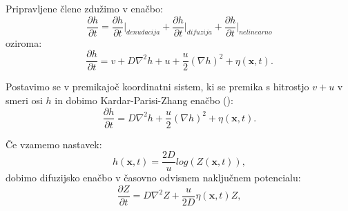 \documentclass[a4paper, twoside, 12pt]{book}
\begin{document}

Pripravljene člene zdužimo v enačbo:
\begin{equation}
  \frac{\partial h}{\partial t} = \frac{\partial h}{\partial t} \bigg|_{denudacija} + \frac{\partial h}{\partial t} \bigg|_{difuzija} + \frac{\partial h}{\partial t} \bigg|_{nelinearno}
  \label{KPZ1}
\end{equation}
oziroma:
\begin{equation}
  \frac{\partial h}{\partial t} = v + D \nabla^2 h + u + \frac{u}{2} (\nabla h)^2 + \eta (\mathbf{x},t).
  \label{KPZ2}
\end{equation}

Postavimo se v premikajoč koordinatni sistem, ki se premika s hitrostjo $v + u$ v smeri osi $h$ in dobimo Kardar-Parisi-Zhang enačbo (\cite{kardar1986dynamic}):
\begin{equation}
  \frac{\partial h}{\partial t} = D \nabla^2 h + \frac{u}{2} (\nabla h)^2 + \eta (\mathbf{x},t).
  \label{KPZ}
\end{equation}

Če vzamemo nastavek:
\begin{equation}
  h(\mathbf{x},t) = \frac{2 D}{u} log(Z(\mathbf{x},t)),
\end{equation}
dobimo difuzijsko enačbo v časovno odvisnem naključnem potencialu:
\begin{equation}
  \frac{\partial Z}{\partial t} = D \nabla^2 Z + \frac{u}{2 D} \eta(\mathbf{x},t) Z,
  \label{KPZ3}
\end{equation}
\end{document}
